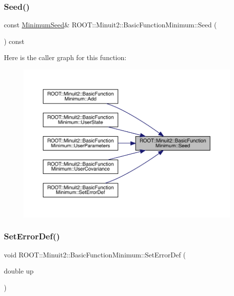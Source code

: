 \subsubsection{\texorpdfstring{Seed()}{Seed()}\hspace{0.1cm}{\footnotesize\ttfamily [2/2]}}
{\footnotesize\ttfamily const \mbox{\hyperlink{classROOT_1_1Minuit2_1_1MinimumSeed}{Minimum\+Seed}}\& R\+O\+O\+T\+::\+Minuit2\+::\+Basic\+Function\+Minimum\+::\+Seed (\begin{DoxyParamCaption}{ }\end{DoxyParamCaption}) const\hspace{0.3cm}{\ttfamily [inline]}}

Here is the caller graph for this function\+:\nopagebreak
\begin{figure}[H]
\begin{center}
\leavevmode
\includegraphics[width=350pt]{de/d25/classROOT_1_1Minuit2_1_1BasicFunctionMinimum_a925aba07b861d7b3d1e5386411a5ea2f_icgraph}
\end{center}
\end{figure}
\mbox{\label{classROOT_1_1Minuit2_1_1BasicFunctionMinimum_ae89163fbfaccda743a6ca8d3add896dc}} 
\subsubsection{\texorpdfstring{SetErrorDef()}{SetErrorDef()}\hspace{0.1cm}{\footnotesize\ttfamily [1/2]}}
{\footnotesize\ttfamily void R\+O\+O\+T\+::\+Minuit2\+::\+Basic\+Function\+Minimum\+::\+Set\+Error\+Def (\begin{DoxyParamCaption}\item[{double}]{up }\end{DoxyParamCaption})\hspace{0.3cm}{\ttfamily [inline]}}

